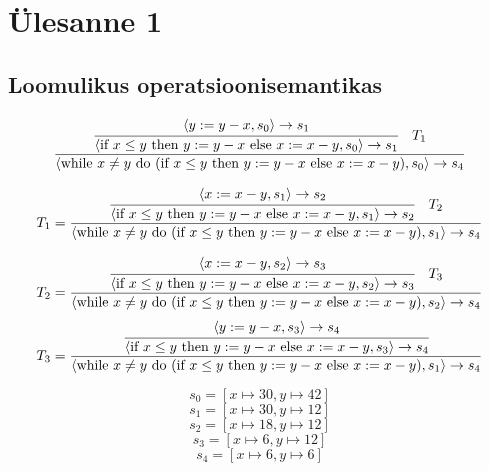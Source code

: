 \section{Ülesanne 1}
\subsection{Loomulikus operatsioonisemantikas}

\[
  \frac{
    \cfrac
      {\langle y := y-x, s_0 \rangle \rightarrow s_1}
      {\langle
       \text{if\ } x \leq y
         \text{\ then\ } y := y-x
         \text{\ else\ } x := x-y
        ,s_0
        \rangle \rightarrow s_1
      }
      \quad
      T_1
  }{
    \langle
    \text{while\ } x \neq  y \text{\ do\ }
      (\text{if\ } x \leq y
        \text{\ then\ } y := y-x
        \text{\ else\ } x := x-y)
      , s_0
    \rangle \rightarrow s_4
  }
\]

\[
  T_1 = \frac{
    \cfrac
    {\langle x := x-y, s_1 \rangle \rightarrow s_2 }
    {\langle
     \text{if\ } x \leq y
       \text{\ then\ } y := y-x
       \text{\ else\ } x:= x-y
     , s_1
     \rangle \rightarrow s_2
    }
    \quad
    T_2
  }{
    \langle
    \text{while\ } x \neq y \text{\ do\ }
      (\text{if\ } x \leq y
        \text{\ then\ } y := y-x
        \text{\ else\ } x:= x-y)
      , s_1
    \rangle \rightarrow s_4
  }
\]

\[
  T_2 = \frac{
    \cfrac
    {\langle x := x-y, s_2 \rangle \rightarrow s_3
    }{\langle 
        \text{if\ } x \leq y
          \text{\ then\ } y := y-x
          \text{\ else\ } x := x-y
        , s_2
      \rangle \rightarrow s_3
    }
    \quad
    T_3
  }{
    \langle 
    \text{while\ } x \neq  y \text{\ do\ }
      (\text{if\  } x \leq y
        \text{\  then\  } y := y-x
        \text{\  else\  } x := x-y)
      , s_2
    \rangle \rightarrow s_4
  }
\]
\[
  T_3 = \frac{
    \cfrac
    {\langle y := y-x, s_3 \rangle \rightarrow s_4
    }{\langle
      \text{if\ } x \leq y
        \text{\ then\ } y := y-x
        \text{\ else\ } x := x-y
      , s_3
      \rangle \rightarrow s_4
    }
  }{
    \langle
    \text{while\ } x \neq y \text{\ do\ }
      (\text{if\ } x \leq y
        \text{\ then\ } y := y-x
        \text{\ else\ } x := x-y )
      , s_1
    \rangle \rightarrow s_4
  }
\]

\[s_0 = [x \mapsto 30, y \mapsto 42]\]
\[s_1 = [x \mapsto 30, y \mapsto 12]\]
\[s_2 = [x \mapsto 18, y \mapsto 12]\]
\[s_3 = [x \mapsto 6, y \mapsto 12]\]
\[s_4 = [x \mapsto 6, y \mapsto 6]\]

